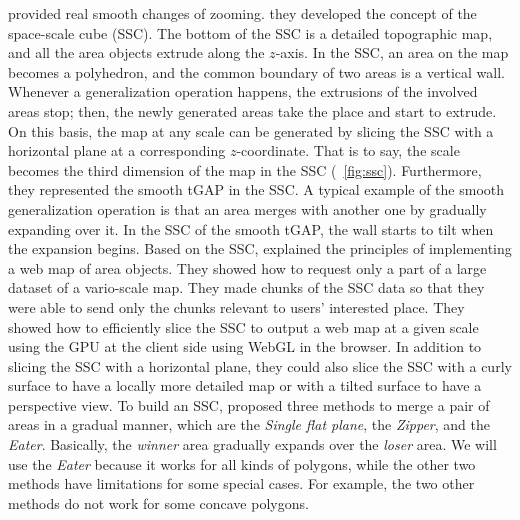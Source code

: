 \documentclass[twocolumn]{svjour3}          %
\begin{document}
 provided real smooth changes of zooming.
they developed the concept of the space-scale cube (SSC).
The bottom of the SSC is a detailed topographic map,
and all the area objects extrude along the $z$-axis.
In the SSC, an area on the map becomes a polyhedron, and
the common boundary of two areas is a vertical wall.
Whenever a generalization operation happens, 
the extrusions of the involved areas stop;
then, the newly generated areas take the place and start to extrude.
On this basis, the map at any scale can be generated by slicing the SSC 
with a horizontal plane at a corresponding $z$-coordinate.
That is to say, the scale becomes the third dimension of the map in the SSC
(\eg~\fig\ref{fig:ssc}).
Furthermore, they represented the smooth tGAP in the SSC.
A typical example of the smooth generalization operation is that 
an area merges with another one by gradually expanding over it.
In the SSC of the smooth tGAP, 
the wall starts to tilt when the expansion begins.
Based on the SSC, \citet{Meijers2020Web} explained the principles of 
implementing a web map of area objects.
They showed how to request only a part of a large dataset of a vario-scale map.
They made chunks of the SSC data
so that they were able to send only the chunks relevant 
to users' interested place.
They showed how to efficiently slice the SSC 
to output a web map at a given scale 
using the GPU at the client side using WebGL in the browser.
In addition to slicing the SSC with a horizontal plane,
they could also slice the SSC with a curly surface 
to have a locally more detailed map
or with a tilted surface to have a perspective view.
To build an SSC, \citet{Suba2014Merge} proposed three methods 
to merge a pair of areas in a gradual manner, 
which are the \emph{Single flat plane}, 
the \emph{Zipper}, and the \emph{Eater}.
Basically, the \emph{winner} area gradually expands over the \emph{loser} area.
We will use the \emph{Eater} because it works for all kinds of polygons,
while the other two methods have limitations for some special cases.
For example, the two other methods do not work for some concave polygons.



\end{document}
